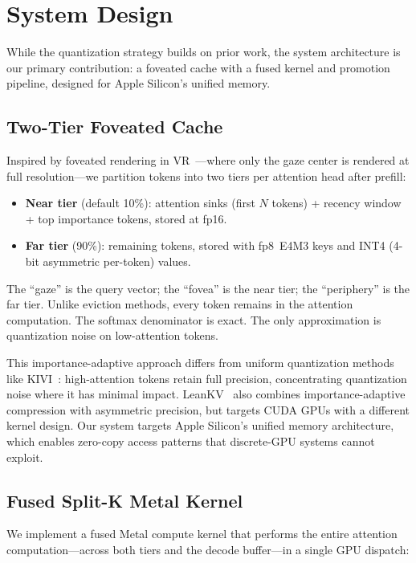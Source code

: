 \documentclass{article}
\begin{document}
\section{System Design}

While the quantization strategy builds on prior work, the system
architecture is our primary contribution: a foveated cache with a fused
kernel and promotion pipeline, designed for Apple Silicon's unified
memory.

\subsection{Two-Tier Foveated Cache}

Inspired by foveated rendering in VR~\cite{guenter2012}---where only the
gaze center is rendered at full resolution---we partition tokens into two
tiers per attention head after prefill:

\begin{itemize}
\item \textbf{Near tier} (default 10\%): attention sinks (first $N$
  tokens) + recency window + top importance tokens, stored at fp16.
\item \textbf{Far tier} (90\%): remaining tokens, stored with fp8~E4M3
  keys and INT4 (4-bit asymmetric per-token) values.
\end{itemize}

The ``gaze'' is the query vector; the ``fovea'' is the near tier; the
``periphery'' is the far tier. Unlike eviction methods, every token
remains in the attention computation. The softmax denominator is exact.
The only approximation is quantization noise on low-attention tokens.

This importance-adaptive approach differs from uniform quantization
methods like KIVI~\cite{kivi}: high-attention tokens retain full
precision, concentrating quantization noise where it has minimal impact.
LeanKV~\cite{leankv} also combines importance-adaptive compression with
asymmetric precision, but targets CUDA GPUs with a different kernel
design. Our system targets Apple Silicon's unified memory architecture,
which enables zero-copy access patterns that discrete-GPU systems cannot
exploit.

\subsection{Fused Split-K Metal Kernel}

We implement a fused Metal compute kernel that performs the entire
attention computation---across both tiers and the decode buffer---in a
single GPU dispatch:
\end{document}
